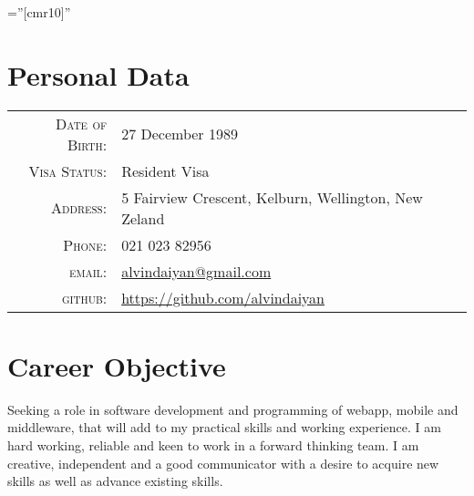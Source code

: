 \documentclass[a4paper,10pt]{article} %
\begin{document}
\pagestyle{empty} %

\font\fb=''[cmr10]'' %


\par{\bigskip\par} %

\section{Personal Data}

\begin{tabular}{rl}

\textsc{Date of Birth:} & 27 December 1989 \\
\textsc{Visa Status:} & Resident Visa \\
\textsc{Address:} & 5 Fairview Crescent, Kelburn, Wellington, New Zeland \\
\textsc{Phone:} & 021 023 82956\\
\textsc{email:} & \href{mailto:alvindaiyan@gmail.com}{alvindaiyan@gmail.com} \\
\textsc{github:} & \href{https://github.com/alvindaiyan}{https://github.com/alvindaiyan}\\

\end{tabular}




\section{Career Objective}

Seeking a role in software development and programming of webapp, mobile and middleware, that will add to my practical skills and working experience. I am hard working, reliable and keen to work in a forward thinking team. I am creative, independent and a good communicator with a desire to acquire new skills as well as advance existing skills.
\end{document}
